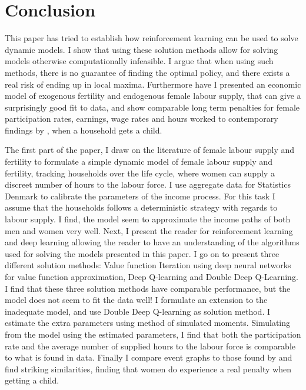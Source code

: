 \section{Conclusion}

This paper has tried to establish how reinforcement learning can be used to solve dynamic models. I show that using these solution methods allow for solving models otherwise computationally infeasible. I argue that when using such methods, there is no guarantee of finding the optimal policy, and there exists a real risk of ending up in local maxima. Furthermore have I presented an economic model of exogenous fertility and endogenous female labour supply, that can give a surprisingly good fit to data, and show comparable long term penalties for female participation rates, earnings, wage rates and hours worked to contemporary findings by \textcite{kleven_children_2019}, when a household gets a child. 

The first part of the paper, I draw on the literature of female labour supply and fertility to formulate a simple dynamic model of female labour supply and fertility, tracking households over the life cycle, where women can supply a discreet number of hours to the labour force. I use aggregate data for Statistics Denmark to calibrate the parameters of the income process. For this task I assume that the households follows a deterministic strategy with regards to labour supply. I find, the model seem to approximate the income paths of both men and women very well. Next, I present the reader for reinforcement learning and deep learning allowing the reader to have an understanding of the algorithms used for solving the models presented in this paper.  I go on to present three different solution methods: Value function Iteration using deep neural networks for value function approximation, Deep Q-learning and Double Deep Q-Learning. I find that these three solution methods have comparable performance, but the model does not seem to fit the data well! I formulate an extension to the inadequate model, and use Double Deep Q-learning as solution method. I estimate the extra parameters using method of simulated moments. Simulating from the model using the estimated parameters, I find that both the participation rate and the average number of supplied hours to the labour force is comparable to what is found in data. Finally I compare event graphs to those found by \textcite{kleven_children_2019} and find striking similarities, finding that women do experience a real penalty when getting a child.